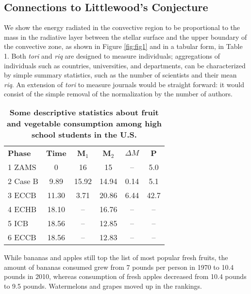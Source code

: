 \subsection{Connections to Littlewood's Conjecture}

We show the energy radiated in the convective region to be proportional to the mass in the radiative layer between the stellar surface and the upper boundary of the convective zone, as shown in Figure \ref{fig:fig1} and in a tabular form, in Table 1. Both {\it tori} and {\it riq} are designed to measure individuals; aggregations of individuals such as countries, universities, and departments, can be characterized by simple summary statistics, such as the number of scientists and their mean {\it riq}. An extension of {\it tori} to measure journals would be straight forward: it would consist of the simple removal of the normalization by the number of authors.  

\begin{table}
\begin{center}
\begin{tabular}{lccccc}
\hline
\textbf{Phase}        & \textbf{Time} & \textbf{M$_1$}  & \textbf{M$_2$} &  \textbf{$\Delta M$} & \textbf{P} \\   
1 ZAMS           & 0      & 16     & 15    & --   & 5.0   \\            
2 Case B       & 9.89   & 15.92  & 14.94 & 0.14 & 5.1   \\
3 ECCB        & 11.30  &  3.71  & 20.86 & 6.44 & 42.7  \\
4 ECHB      & 18.10  & --     & 16.76 &  --  & --    \\
5 ICB       & 18.56  & --     & 12.85 &  --  & --    \\    
6 ECCB      & 18.56  & --     & 12.83 &  --  & --    \\
\hline
\end{tabular}
\end{center}
\caption{\textbf{Some descriptive statistics about fruit and vegetable consumption among high school students in the U.S.}}
\end{table}

While bananas and apples still top the list of most popular fresh fruits, the amount of bananas consumed grew from 7 pounds per person in 1970 to 10.4 pounds in 2010, whereas consumption of fresh apples decreased from 10.4 pounds to 9.5 pounds. Watermelons and grapes moved up in the rankings.
